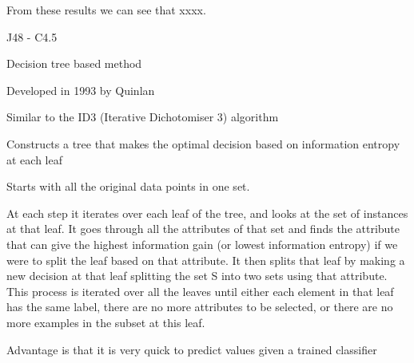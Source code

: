 \documentclass[12pt,oneside]{book}
\begin{document}
From these results we can see that xxxx.

%
%

J48 - C4.5

Decision tree based method

Developed in 1993 by Quinlan \cite{quinlan93}

Similar to the ID3 (Iterative Dichotomiser 3) algorithm \cite{quinlan86}

Constructs a tree that makes the optimal decision based on information
entropy at each leaf

Starts with all the original data points in one set.

At each step it iterates over each leaf of the tree, and looks at the
set of instances at that leaf.  It goes through all the attributes of
that set and finds the attribute that can give the highest information
gain (or lowest information entropy) if we were to split the leaf
based on that attribute.  It then splits that leaf by making a new
decision at that leaf splitting the set S into two sets using that
attribute.  This process is iterated over all the leaves until either
each element in that leaf has the same label, there are no more
attributes to be selected, or there are no more examples in the subset
at this leaf.

Advantage is that it is very quick to predict values given a trained
classifier
\end{document}
